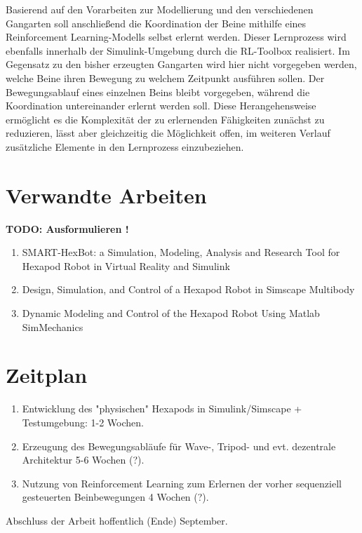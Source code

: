 Basierend auf den Vorarbeiten zur Modellierung und den verschiedenen Gangarten soll anschließend die Koordination der Beine mithilfe eines Reinforcement Learning-Modells selbst erlernt werden.
Dieser Lernprozess wird ebenfalls innerhalb der Simulink-Umgebung durch die RL-Toolbox realisiert.
Im Gegensatz zu den bisher erzeugten Gangarten wird hier nicht vorgegeben werden, welche Beine ihren Bewegung zu welchem Zeitpunkt ausführen sollen.
Der Bewegungsablauf eines einzelnen Beins bleibt vorgegeben, während die Koordination untereinander erlernt werden soll. 
Diese Herangehensweise ermöglicht es die Komplexität der zu erlernenden Fähigkeiten zunächst zu reduzieren, lässt aber gleichzeitig die Möglichkeit offen, im weiteren Verlauf zusätzliche Elemente in den Lernprozess einzubeziehen.


\section{Verwandte Arbeiten}
\textbf{TODO: Ausformulieren !}
\begin{enumerate}

\item SMART-HexBot: a Simulation, Modeling, Analysis and
Research Tool for Hexapod Robot in Virtual Reality and
Simulink

\item Design, Simulation, and Control of a Hexapod Robot in
Simscape Multibody

\item Dynamic Modeling and Control of the Hexapod Robot Using Matlab SimMechanics

\end{enumerate}


\section{Zeitplan}
\begin{enumerate}
	\item Entwicklung des "physischen" Hexapods in Simulink/Simscape + Testumgebung: 1-2 Wochen.
	\item Erzeugung des Bewegungsabläufe für Wave-, Tripod- und evt. dezentrale Architektur 5-6 Wochen (?).
	\item Nutzung von Reinforcement Learning zum Erlernen der vorher sequenziell gesteuerten Beinbewegungen 4 Wochen (?).
\end{enumerate}


Abschluss der Arbeit hoffentlich (Ende) September.